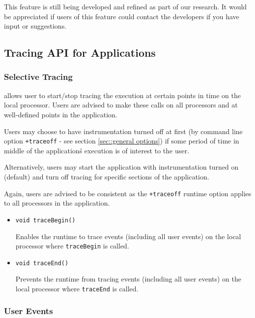 This feature is still being developed and refined as part of our
research. It would be appreciated if users of this feature could
contact the developers if you have input or suggestions.


\subsection{Tracing API for \charmpp{} Applications}
\label{sec::api}

\subsubsection{Selective Tracing}
\label{sec::selective tracing}

\charmpp{} allows user to start/stop tracing the execution at certain
points in time on the local processor. Users are advised to make these
calls on all processors and at well-defined points in the application.

Users may choose to have instrumentation turned off at first (by
command line option {\tt +traceoff} - see section \ref{sec::general options}) if some period of time in middle of the
application\'s execution is of interest to the user.

Alternatively, users may start the application with instrumentation
turned on (default) and turn off tracing for specific sections of the
application.

Again, users are advised to be consistent as the {\tt +traceoff}
runtime option applies to all processors in the application.

\begin{itemize}
\item
{\tt void traceBegin()}

Enables the runtime to trace events (including all user events) on the local processor where {\tt traceBegin} is called.

\item
{\tt void traceEnd()}

Prevents the runtime from tracing events (including all user events) on the local processor where {\tt traceEnd} is called.

\end{itemize}

\subsubsection{User Events}
\label{sec::user events}

